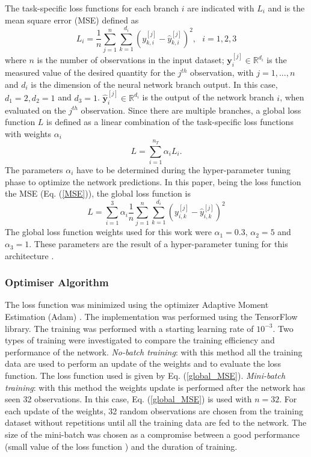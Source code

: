 \documentclass[final,5p,times,twocolumn]{elsarticle}
\begin{document}
The task-specific loss functions for each branch $i$ are indicated with $L_i$ and is the mean square error (MSE) defined as
\begin{equation}
L_i = \frac{1}{n} \sum_{j=1}^n \sum_{k=1}^{d_i} (y_{k,i}^{[j]}-\hat y_{k,i}^{[j]})^2, \ \ \ i=1,2,3
\label{MSE}
\end{equation}
where $n$ is the number of observations in the input dataset; ${\pmb y}_i^{[j]} \in \mathbb{R}^{d_i}$ is the measured value of the desired quantity for the $j^{th}$ observation, with $j=1, ..., n$  and $d_i$ is the dimension of the neural network branch output. In this case, $d_1=2, d_2=1$ and $d_3=1$. $ \hat {\pmb y}_i^{[j]} \in \mathbb{R}^{d_i}$ is the output of the network branch $i$, when evaluated on the $j^{th}$ observation. Since there are multiple branches, a global loss function $L$ is defined as a linear combination of the task-specific loss functions with weights $\alpha_i$ 
\begin{equation}
L = \sum_{i=1}^{n_T}\alpha_i L_i .
\label{globalcf}
\end{equation}
The parameters $\alpha_i$ have to be determined during the hyper-parameter tuning phase to optimize the network predictions.
In this paper, being the loss function the MSE (Eq. (\ref{MSE})), the global loss function is
\begin{equation}
L = \sum_{i=1}^{3}\alpha_i \frac{1}{n} \sum_{j=1}^n \sum_{k=1}^{d_i} (y_{i,k}^{[j]}-\hat y_{i,k}^{[j]})^2
\label{global_MSE}
\end{equation}
The global loss function weights used for this work were $\alpha_1 = 0.3$, $\alpha_2 = 5$ and $\alpha_3 = 1$. These parameters are the result of a hyper-parameter tuning for this architecture \cite{Michelucci2019_2}.
 

\subsubsection{Optimiser Algorithm}
\label{training}

The loss function was minimized using the optimizer Adaptive Moment Estimation (Adam) \cite{Kingma2014, Michelucci2017}. The implementation was performed using the TensorFlow\texttrademark $\ $library. The training was performed with a starting learning rate of $10^{-3}$. Two types of training were investigated to compare the training efficiency and performance of the network. {\sl No-batch training}: with this method all the training data  are used to perform an update of the weights and to evaluate the loss function. The loss function used is given by Eq. (\ref{global_MSE}). {\sl Mini-batch training}: with this method the weights update is performed after the network has seen 32 observations. In this case, Eq. (\ref{global_MSE}) is used with $n=32$. For each update of the weights, 32 random observations are chosen from the training dataset without repetitions until all the training data are fed to the network. 
The size of the mini-batch was chosen as a compromise between a good performance (small value of the loss function ) and the duration of training.
\end{document}
